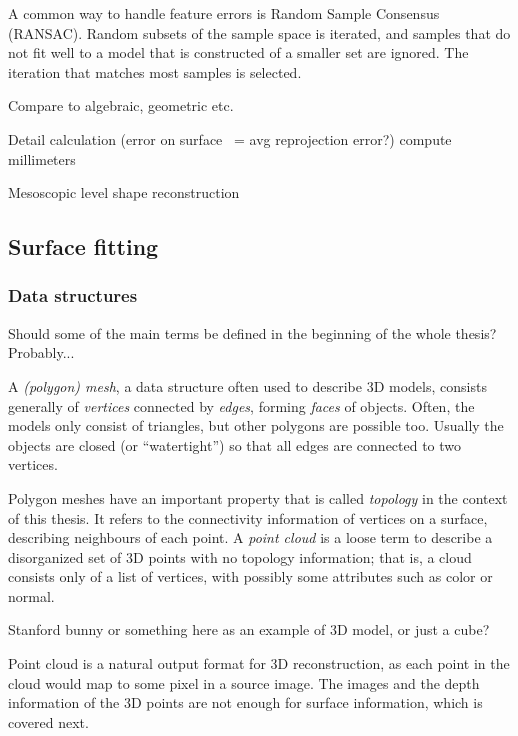 A common way to handle feature errors is Random Sample Consensus (RANSAC). Random subsets of the sample space is iterated, and samples that do not fit well to a model that is constructed of a smaller set are ignored. The iteration that matches most samples is selected. \cite{hartley03multiview}

Compare to algebraic, geometric etc.

Detail calculation (error on surface ~= avg reprojection error?) compute millimeters

Mesoscopic level shape reconstruction


\subsection{Surface fitting} %

\subsubsection{Data structures} %

Should some of the main terms be defined in the beginning of the whole thesis? Probably...

A \textit{(polygon) mesh}, a data structure often used to describe 3D models, consists generally of \textit{vertices} connected by \textit{edges}, forming \textit{faces} of objects. Often, the models only consist of triangles, but other polygons are possible too.
Usually the objects are closed (or ``watertight'') so that all edges are connected to two vertices.

Polygon meshes have an important property that is called \textit{topology} in the context of this thesis.
It refers to the connectivity information of vertices on a surface, describing neighbours of each point.
A \textit{point cloud} is a loose term to describe a disorganized set of 3D points with no topology information; that is, a cloud consists only of a list of vertices, with possibly some attributes such as color or normal.

Stanford bunny or something here as an example of 3D model, or just a cube?


Point cloud is a natural output format for 3D reconstruction, as each point in the cloud would map to some pixel in a source image.
The images and the depth information of the 3D points are not enough for surface information, which is covered next.

